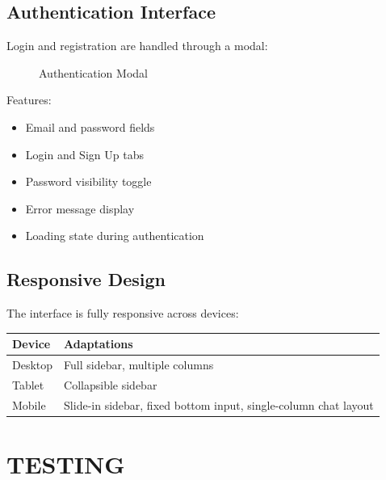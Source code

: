 \documentclass[12pt,a4paper]{book}
\numberwithin{table}{chapter}
\numberwithin{figure}{chapter}
\numberwithin{equation}{chapter}
\begin{document}
\section{Authentication Interface}

Login and registration are handled through a modal:

\begin{figure}[h]
\caption{Authentication Modal}
\label{fig:auth}
\end{figure}

Features:
\begin{itemize}
    \item Email and password fields
    \item Login and Sign Up tabs
    \item Password visibility toggle
    \item Error message display
    \item Loading state during authentication
\end{itemize}

\section{Responsive Design}

The interface is fully responsive across devices:

\begin{longtable}{|p{1.5in}|p{4in}|}
\hline
\textbf{Device} & \textbf{Adaptations}\\
\hline
Desktop & Full sidebar, multiple columns\\
\hline
Tablet & Collapsible sidebar\\
\hline
Mobile & Slide-in sidebar, fixed bottom input, single-column chat layout\\
\hline
\end{longtable}

\clearpage

\chapter{TESTING}
\end{document}
